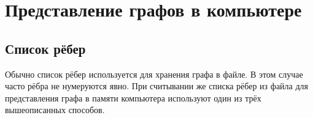 
\chapter{Представление графов в компьютере}

\section{Список рёбер}

Обычно список рёбер используется для хранения графа в файле. В этом случае часто
рёбра не нумеруются явно. При считывании же списка рёбер из файла для 
представления графа в памяти компьютера используют один из трёх вышеописанных 
способов.
